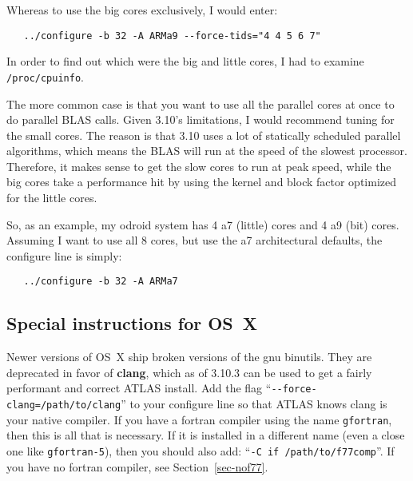 \documentclass[11pt]{article}
\begin{document}
Whereas to use the big cores exclusively, I would enter:
\begin{verbatim}
   ../configure -b 32 -A ARMa9 --force-tids="4 4 5 6 7"
\end{verbatim}

In order to find out which were the big and little cores, I had to examine
\verb+/proc/cpuinfo+.

The more common case is that you want to use all the parallel cores at once
to do parallel BLAS calls.
Given 3.10's limitations, I would recommend tuning for the small cores.  
The reason is that 3.10 uses a lot of statically scheduled parallel algorithms,
which means the BLAS will run at the speed of the slowest processor.
Therefore, it makes sense to get the slow cores to run at peak speed,
while the big cores take a performance hit by using the kernel and block
factor optimized for the little cores.  

So, as an example, my odroid system has 4 a7 (little) cores and 4 a9
(bit) cores.  Assuming I want to use all 8 cores, but use the a7 architectural
defaults, the configure line is simply:
\begin{verbatim}
   ../configure -b 32 -A ARMa7
\end{verbatim}



\subsection{Special instructions for OS~X}
Newer versions of OS~X ship broken versions of the gnu binutils.  They
are deprecated in favor of \textbf{clang}, which as of 3.10.3 can be used
to get a fairly performant and correct ATLAS install.  Add the flag
``\verb+--force-clang=/path/to/clang+'' to your configure line so that 
ATLAS knows clang is your native
compiler.  If you have a fortran compiler using the name {\tt gfortran},
then this is all that is necessary.   If it is installed in a different
name (even a close one like {\tt gfortran-5}), then you should also
add: ``\verb+-C if /path/to/f77comp+''.
If you have no fortran compiler, see Section~\ref{sec-nof77}.
\end{document}
